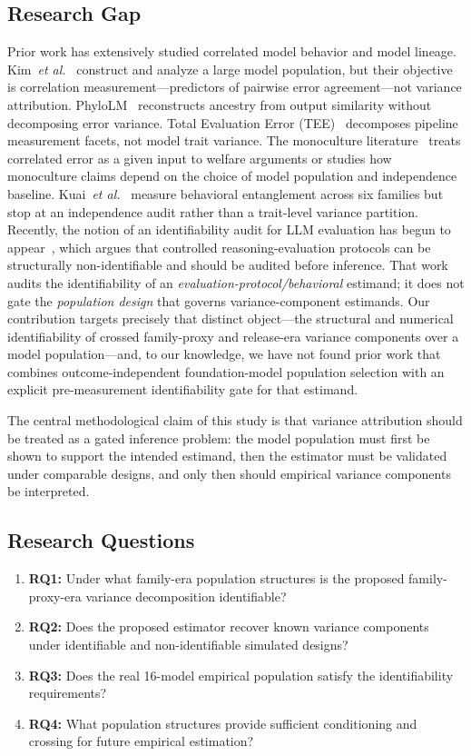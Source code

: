 \documentclass[11pt]{article}
\theoremstyle{definition}
\theoremstyle{plain}
\begin{document}
\subsection{Research Gap}
Prior work has extensively studied correlated model behavior and model lineage. Kim~\textit{et al.}~\cite{kim2025} construct and analyze a large model population, but their objective is correlation measurement---predictors of pairwise error agreement---not variance attribution. PhyloLM~\cite{phylolm2024} reconstructs ancestry from output similarity without decomposing error variance. Total Evaluation Error (TEE)~\cite{messing2026} decomposes pipeline measurement facets, not model trait variance. The monoculture literature~\cite{kleinberg2021,bommasani2022,jo2026} treats correlated error as a given input to welfare arguments or studies how monoculture claims depend on the choice of model population and independence baseline. Kuai~\textit{et al.}~\cite{kuai2026} measure behavioral entanglement across six families but stop at an independence audit rather than a trait-level variance partition. Recently, the notion of an identifiability audit for LLM evaluation has begun to appear~\cite{identaudit2026}, which argues that controlled reasoning-evaluation protocols can be structurally non-identifiable and should be audited before inference. That work audits the identifiability of an \emph{evaluation-protocol/behavioral} estimand; it does not gate the \emph{population design} that governs variance-component estimands. Our contribution targets precisely that distinct object---the structural and numerical identifiability of crossed family-proxy and release-era variance components over a model population---and, to our knowledge, we have not found prior work that combines outcome-independent foundation-model population selection with an explicit pre-measurement identifiability gate for that estimand.

The central methodological claim of this study is that variance attribution should be treated as a gated inference problem: the model population must first be shown to support the intended estimand, then the estimator must be validated under comparable designs, and only then should empirical variance components be interpreted.

\subsection{Research Questions}
\begin{enumerate}
\item \textbf{RQ1:} Under what family-era population structures is the proposed family-proxy-era variance decomposition identifiable?
\item \textbf{RQ2:} Does the proposed estimator recover known variance components under identifiable and non-identifiable simulated designs?
\item \textbf{RQ3:} Does the real 16-model empirical population satisfy the identifiability requirements?
\item \textbf{RQ4:} What population structures provide sufficient conditioning and crossing for future empirical estimation?
\end{enumerate}
\end{document}

